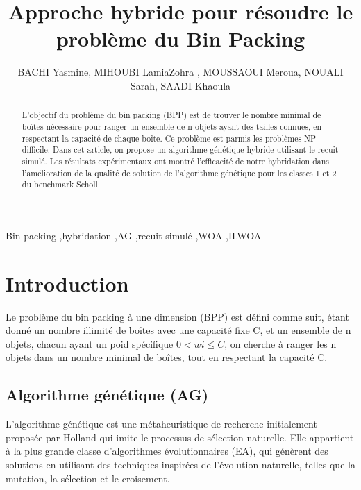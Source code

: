 \documentclass[preprint]{elsarticle}
\begin{document}
\pagestyle{fancy}
\begin{frontmatter}


\title{Approche hybride pour résoudre le problème du Bin Packing}
\author{BACHI Yasmine, MIHOUBI LamiaZohra , MOUSSAOUI Meroua, NOUALI Sarah, SAADI Khaoula}
\address{Ecole nationale Supérieure d'Informatique -ESI-Alger}
\begin{abstract}
L’objectif du problème du bin packing (BPP) est de trouver le nombre minimal de boîtes nécessaire pour ranger un ensemble de n objets ayant des tailles connues, en respectant la capacité de chaque boîte. Ce problème est parmis les problèmes NP-difficile. Dans cet article, on propose un algorithme génétique  hybride utilisant le recuit simulé. Les résultats expérimentaux   ont montré l’efficacité de notre hybridation dans l’amélioration de la qualité de solution de l’algorithme génétique pour les classes 1 et 2 du benchmark Scholl. \end{abstract}

\begin{keyword}
Bin packing \sep hybridation \sep AG \sep recuit simulé \sep WOA \sep ILWOA 
\end{keyword}

\end{frontmatter}


\section{Introduction}
\label{S:1}

Le problème du bin packing à une dimension (BPP) est défini comme suit, étant donné un nombre illimité de boîtes avec une capacité fixe C, et un ensemble de n objets, chacun ayant un poid spécifique $0<wi\leqslant C$, on cherche à ranger les n objets dans un nombre minimal de boîtes, tout en respectant la capacité C. 


\subsection{Algorithme génétique (AG)}
L’algorithme génétique est une métaheuristique de recherche initialement proposée par Holland \cite{Holland} qui imite le processus de sélection naturelle. Elle appartient à la plus grande classe d'algorithmes évolutionnaires (EA), qui génèrent des solutions en utilisant des techniques inspirées de l'évolution naturelle, telles que la mutation, la sélection et le croisement.
\end{document}
